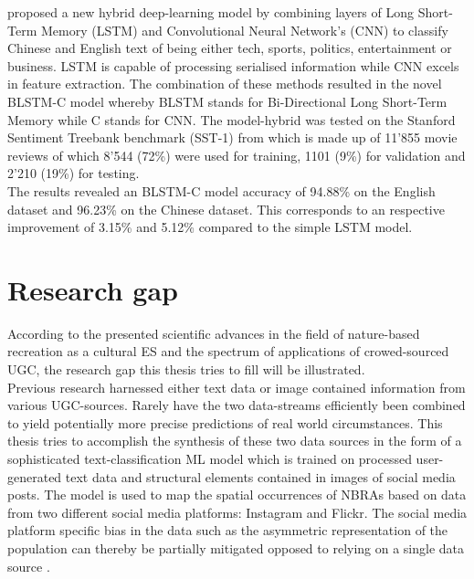 \textcite{Li2018} proposed a new hybrid deep-learning model by combining layers of Long Short-Term Memory (LSTM) and Convolutional Neural Network's (CNN) to classify Chinese and English text of being either tech, sports, politics, entertainment or business. LSTM is capable of processing serialised information while CNN excels in feature extraction. The combination of these methods resulted in the novel BLSTM-C model whereby BLSTM stands for Bi-Directional Long Short-Term Memory while C stands for CNN. The model-hybrid was tested on the Stanford Sentiment Treebank benchmark (SST-1) from \textcite{Socher2013} which is made up of 11'855 movie reviews of which 8'544 (72\%) were used for training, 1101 (9\%) for validation and 2'210 (19\%) for testing. \\The results revealed an BLSTM-C model accuracy
of 94.88\% on the English dataset and 96.23\% on the Chinese dataset. This corresponds to an respective improvement of 3.15\% and 5.12\% compared to the simple LSTM model.


\section{Research gap}
According to the presented scientific advances in the field of nature-based recreation as a cultural ES and the spectrum of applications of crowed-sourced UGC, the research gap this thesis tries to fill will be illustrated. \\

Previous research harnessed either text data \parencite{Barchiesi2015, Monkman2018, Wartmann2018} or image contained information \parencite{Richards2018, Heikinheimo2017} from various UGC-sources. Rarely have the two data-streams efficiently been combined to yield potentially more precise predictions of real world circumstances. This thesis tries to accomplish the synthesis of these two data sources in the form of a sophisticated text-classification ML model which is trained on processed user-generated text data and structural elements contained in images of social media posts. The model is used to map the spatial occurrences of NBRAs based on data from two different social media platforms: Instagram and Flickr. The social media platform specific bias in the data such as the asymmetric representation of the population can thereby be partially mitigated opposed to relying on a single data source \parencite{Barchiesi2015, Grossenbacher2014, Monkman2018, Mancini2018}. \\

